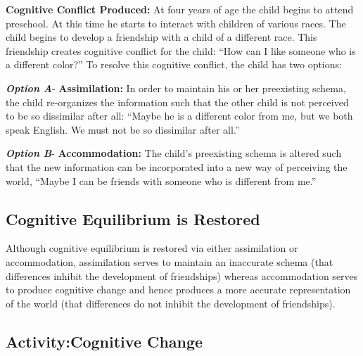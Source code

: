 \documentclass[
]{book}
\begin{document}
\textbf{Cognitive Conflict Produced:} At four years of age the child begins to attend preschool. At this time he starts to interact with children of various races. The child begins to develop a friendship with a child of a different race. This friendship creates cognitive conflict for the child: ``How can I like someone who is a different color?'' To resolve this cognitive conflict, the child has two options:

\textbf{\emph{Option A}}- \textbf{Assimilation:} In order to maintain his or her preexisting schema, the child re-organizes the information such that the other child is not perceived to be so dissimilar after all: ``Maybe he is a different color from me, but we both speak English. We must not be so dissimilar after all.''

\textbf{\emph{Option B}}- \textbf{Accommodation:} The child's preexisting schema is altered such that the new information can be incorporated into a new way of perceiving the world, ``Maybe I can be friends with someone who is different from me.''

\hypertarget{cognitive-equilibrium-is-restored}{%
\subsection*{Cognitive Equilibrium is Restored}\label{cognitive-equilibrium-is-restored}}

Although cognitive equilibrium is restored via either assimilation or accommodation, assimilation serves to maintain an inaccurate schema (that differences inhibit the development of friendships) whereas accommodation serves to produce cognitive change and hence produces a more accurate representation of the world (that differences do not inhibit the development of friendships).

\hypertarget{activitycognitive-change}{%
\subsection*{Activity:Cognitive Change}\label{activitycognitive-change}}
\end{document}

